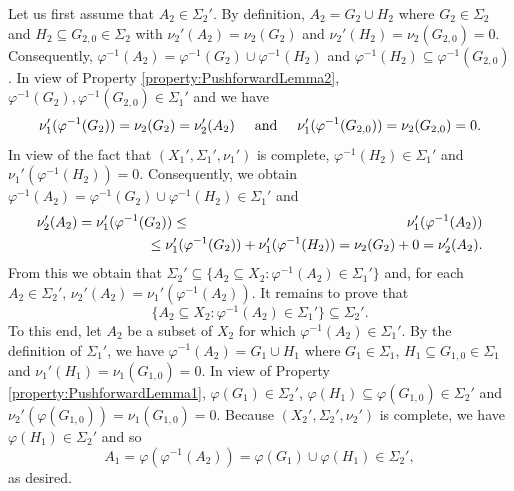 \documentclass[smallextended]{svjour3}
\theoremstyle{remark}
\renewenvironment{proof}[1][\proofname]{\renewcommand\xproofname{#1}\xproof}{\endxproof}
\begin{document}
\begin{proof}
Let us first assume that $A_2\in\Sigma_2'$. By definition, $A_2=G_2\cup H_2$ where $G_2\in\Sigma_2$ and $H_2\subseteq G_{2,0}\in \Sigma_2$ with $\nu_2'(A_2)=\nu_2(G_2)$ and $\nu_2'(H_2)=\nu_2(G_{2,0})=0$. Consequently, $\varphi^{-1}(A_2)=\varphi^{-1}(G_2)\cup\varphi^{-1}(H_2)$ and $\varphi^{-1}(H_2)\subseteq \varphi^{-1}(G_{2,0})$. In view of Property \ref{property:PushforwardLemma2}, $\varphi^{-1}(G_2),\varphi^{-1}(G_{2,0})\in \Sigma_1'$ and we have
\begin{equation*}
\nu_1'(\varphi^{-1}(G_2))=\nu_2(G_2)=\nu_2'(A_2)\hspace{0.5cm}\mbox{and}\hspace{0.5cm}\nu_1'(\varphi^{-1}(G_{2,0}))=\nu_2(G_{2,0})=0.
\end{equation*}
In view of the fact that $(X_1',\Sigma_1',\nu_1')$ is complete, $\varphi^{-1}(H_2)\in\Sigma_1'$ and \break $\nu_1'(\varphi^{-1}(H_2))=0$. Consequently, we obtain $\varphi^{-1}(A_2)=\varphi^{-1}(G_2)\cup\varphi^{-1}(H_2)\in\Sigma_1'$ and
\begin{eqnarray*}
\nu_2'(A_2)=\nu_1'(\varphi^{-1}(G_2))
&\leq&\nu_1'(\varphi^{-1}(A_2))\\ &&\hspace{-0.5in}\leq\nu_1'(\varphi^{-1}(G_2))+\nu_1'(\varphi^{-1}(H_2))=\nu_2(G_2)+0=\nu_2'(A_2).
\end{eqnarray*}
From this we obtain that $\Sigma_2'\subseteq \{A_2\subseteq X_2:\varphi^{-1}(A_2)\in\Sigma_1'\}$ and, for each $A_2\in\Sigma_2'$, $\nu_2'(A_2)=\nu_1'(\varphi^{-1}(A_2))$. It remains to prove that
\begin{equation*}
\{A_2\subseteq X_2:\varphi^{-1}(A_2)\in\Sigma_1'\}\subseteq \Sigma_2'.
\end{equation*}
To this end, let $A_2$ be a subset of $X_2$ for which $\varphi^{-1}(A_2)\in\Sigma_1'$. By the definition of $\Sigma_1'$, we have $\varphi^{-1}(A_2)=G_1\cup H_1$ where $G_1\in\Sigma_1$, $H_1\subseteq G_{1,0}\in\Sigma_1$ and $\nu_1'(H_1)=\nu_1(G_{1,0})=0$. In view of Property \ref{property:PushforwardLemma1}, $\varphi(G_1)\in\Sigma_2'$, $\varphi(H_1)\subseteq\varphi(G_{1,0})\in\Sigma_2'$ and $\nu_2'(\varphi(G_{1,0}))=\nu_1(G_{1,0})=0$. Because $(X_2',\Sigma_2',\nu_2')$ is complete, we have $\varphi(H_1)\in\Sigma_2'$ and so
\begin{equation*}
A_1=\varphi(\varphi^{-1}(A_2))=\varphi(G_1)\cup\varphi(H_1)\in \Sigma_2',
\end{equation*}
as desired.
\end{proof}
\end{document}
